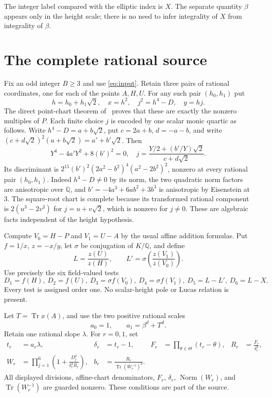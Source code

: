 \documentclass[11pt,a4paper]{article}
\newcommand{\Q}{\mathbb Q}\newcommand{\Z}{\mathbb Z}
\DeclareMathOperator{\Tr}{Tr}\DeclareMathOperator{\rad}{rad}
\begin{document}
The integer label compared with the elliptic index is $X$.
The separate quantity $\beta$ appears only in the height scale;
there is no need to infer integrality of $X$ from integrality
of $\beta$.

\section{The complete rational source}

Fix an odd integer $B\ge3$ and use \eqref{eq:input}.
Retain three pairs of rational coordinates, one for each of the
points $A,H,U$. For any such pair $(h_0,h_1)$ put
\[
 h=h_0+h_1\sqrt2,\quad x=h^2,\quad j^2=h^4-D,\quad y=hj.
\]
The direct point-chart theorem of~\cite{Source27} proves that
these are exactly the nonzero multiples of $P$. Each finite
choice $j$ is encoded by one scalar monic quartic as follows.
Write $h^4-D=a+b\sqrt2$, put
$c=2a+b$, $d=-a-b$, and write
$(c+d\sqrt2)^2(a+b\sqrt2)=a'+b'\sqrt2$.
Then
\[
 Y^4-4a'Y^2+8(b')^2=0,\quad
 j=\frac{Y/2+(b'/Y)\sqrt2}{c+d\sqrt2}.
\]
Its discriminant is
$2^{15}(b')^2(2a^2-b^2)^4(a^2-2b^2)^2$, nonzero at every
rational pair $(h_0,h_1)$. Indeed $h^4-D\ne0$ by its norm,
the two quadratic norm factors are anisotropic over $\Q$, and
$b'=-4a^3+6ab^2+3b^3$ is anisotropic by Eisenstein at 3.
The square-root chart is complete because its transformed rational
component is $2(u^3-2v^3)$ for $j=u+v\sqrt2$, which is nonzero
for $j\ne0$. These are algebraic facts independent of the height hypothesis.

Compute $V_0=H-P$ and $V_1=U-A$ by the usual affine addition
formulas. Put $f=1/x$, $z=-x/y$, let $\sigma$ be conjugation
of $K/\Q$, and define
\[
 L=\frac{z(U)}{z(H)},\qquad
 L'=\sigma\!\left(\frac{z(V_1)}{z(V_0)}\right).
\]
Use precisely the six field-valued tests
\begin{equation}\label{eq:tests}
 D_1=f(H),\ D_2=f(U),\ D_3=\sigma f(V_0),\
 D_4=\sigma f(V_1),\ D_5=L-L',\ D_6=L-X.
\end{equation}
Every test is assigned order one. No scalar-height pole or Lucas
relation is present.

Let $T=\Tr x(A)$, and use the two positive rational scales
\[
                         a_0=1,\qquad a_1=\beta^d+T^d.
\]
Retain one rational slope $\lambda$. For $r=0,1$, set
\begin{align}
 t_r&=a_r\lambda,&\delta_r&=t_r-1,&
 F_r&=\prod_{\theta\in\Theta}(t_r-\theta),&
 R_r&=\frac{F_r}{\delta_r^8},\label{eq:detector}\\
 W_r&=\prod_{j=1}^6\left(1+
             \frac{D_j^2}{\delta_r^4R_r}\right),&
 b_r&=\frac{R_r}{\Tr(W_r^{-1})^2}.\label{eq:W}
\end{align}
All displayed divisions, affine-chart denominators, $F_r$,
$\delta_r$, $\operatorname{Norm}(W_r)$, and $\Tr(W_r^{-1})$
are guarded nonzero. These conditions are part of the source.
\end{document}
